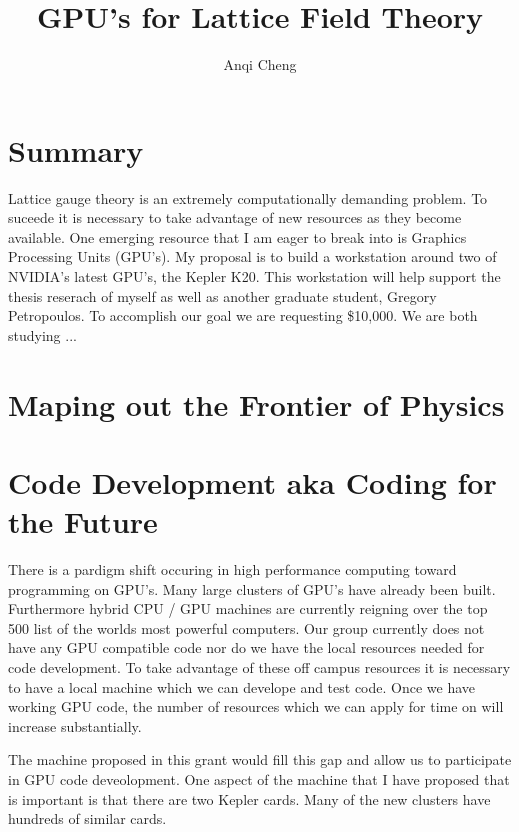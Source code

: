 \documentclass[11pt]{article}
\begin{document}
  \title{GPU's for Lattice Field Theory}
  \author{Anqi Cheng}
  \maketitle

  \section*{Summary} %
  Lattice gauge theory is an extremely computationally demanding problem.  
  To suceede it is necessary to take advantage of new resources as they become available.  
  One emerging resource that I am eager to break into is Graphics Processing Units (GPU's).   
  My proposal is to build a workstation around two of NVIDIA's latest GPU's, the Kepler K20.  
  This workstation will help support the thesis reserach of myself as well as another graduate student, Gregory Petropoulos.  
  To accomplish our goal we are requesting \$10,000.  
  We are both studying ...

  \section*{Maping out the Frontier of Physics} %
  
  
  \section*{Code Development aka Coding for the Future} %
  There is a pardigm shift occuring in high performance computing toward programming on GPU's.  
  Many large clusters of GPU's have already been built.
  Furthermore hybrid CPU / GPU machines are currently reigning over the top 500 list of the worlds most powerful computers.
  Our group currently does not have any GPU compatible code nor do we have the local resources needed for code development.  
  To take advantage of these off campus resources it is necessary to have a local machine which we can develope and test code.
  Once we have working GPU code, the number of resources which we can apply for time on will increase substantially.

  The machine proposed in this grant would fill this gap and allow us to participate in GPU code deveolopment.  One aspect of the machine that I have proposed that is important is that there are two Kepler cards.  Many of the new clusters have hundreds of similar cards.  
  
\end{document}
